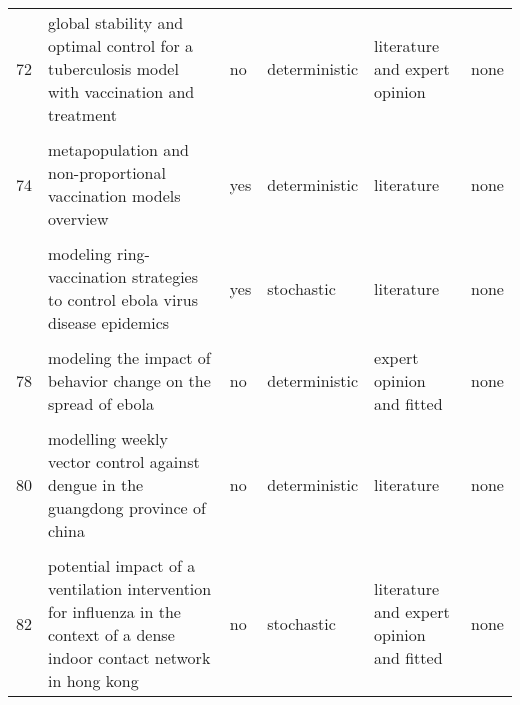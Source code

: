 \documentclass[
]{article}
\begin{document}
\begin{landscape}
\begin{longtable}{l>{\raggedright\arraybackslash}p{3cm}l>{\raggedright\arraybackslash}p{3cm}ll}
72 & global stability and optimal control for a tuberculosis model with vaccination and treatment & no & deterministic & literature and expert opinion & none\\
\cellcolor{gray!6}{73} & \cellcolor{gray!6}{impact on epidemic measles of vaccination campaigns triggered by disease outbreaks or serosurveys: a modeling study} & \cellcolor{gray!6}{no} & \cellcolor{gray!6}{stochastic} & \cellcolor{gray!6}{literature and expert opinion} & \cellcolor{gray!6}{none}\\
74 & metapopulation and non-proportional vaccination models overview & yes & deterministic & literature & none\\
\cellcolor{gray!6}{75} & \cellcolor{gray!6}{model-based comprehensive analysis of school closure policies for mitigating influenza epidemics and pandemics} & \cellcolor{gray!6}{yes} & \cellcolor{gray!6}{stochastic} & \cellcolor{gray!6}{literature and expert opinion and fitted} & \cellcolor{gray!6}{another model}\\
\addlinespace
76 & modeling ring-vaccination strategies to control ebola virus disease epidemics & yes & stochastic & literature & none\\
\cellcolor{gray!6}{77} & \cellcolor{gray!6}{modeling the effect of public health resources and alerting on the dynamics of pertussis spread*} & \cellcolor{gray!6}{no} & \cellcolor{gray!6}{stochastic} & \cellcolor{gray!6}{literature and expert opinion} & \cellcolor{gray!6}{data}\\
78 & modeling the impact of behavior change on the spread of ebola & no & deterministic & expert opinion and fitted & none\\
\cellcolor{gray!6}{79} & \cellcolor{gray!6}{modeling the spread of polio in an ipv-vaccinated population: lessons learned from the 2013 silent outbreak in southern israel} & \cellcolor{gray!6}{no} & \cellcolor{gray!6}{both} & \cellcolor{gray!6}{literature and expert opinion and fitted} & \cellcolor{gray!6}{data}\\
80 & modelling weekly vector control against dengue in the guangdong province of china & no & deterministic & literature & none\\
\addlinespace
\cellcolor{gray!6}{81} & \cellcolor{gray!6}{optimal control strategies for the spread of ebola in west africa} & \cellcolor{gray!6}{no} & \cellcolor{gray!6}{deterministic} & \cellcolor{gray!6}{expert opinion} & \cellcolor{gray!6}{none}\\
82 & potential impact of a ventilation intervention for influenza in the context of a dense indoor contact network in hong kong & no & stochastic & literature and expert opinion and fitted & none\\

\end{longtable}
\end{landscape}
\end{document}
